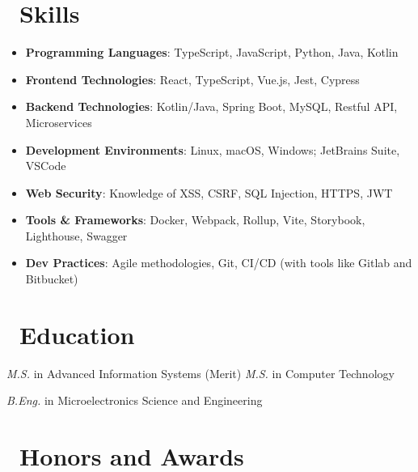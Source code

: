 \documentclass{resume}
\begin{document}

\section{\faCogs\ Skills}
\begin{itemize}[parsep=0.5ex]
  \item \textbf{Programming Languages}: TypeScript, JavaScript, Python, Java, Kotlin
  \item \textbf{Frontend Technologies}: React, TypeScript, Vue.js, Jest, Cypress
  \item \textbf{Backend Technologies}: Kotlin/Java, Spring Boot, MySQL, Restful API, Microservices
  \item \textbf{Development Environments}: Linux, macOS, Windows; JetBrains Suite, VSCode
  \item \textbf{Web Security}: Knowledge of XSS, CSRF, SQL Injection, HTTPS, JWT
  \item \textbf{Tools \& Frameworks}: Docker, Webpack, Rollup, Vite, Storybook, Lighthouse, Swagger 
  \item \textbf{Dev Practices}: Agile methodologies, Git, CI/CD (with tools like Gitlab and Bitbucket)
\end{itemize}

\section{\faGraduationCap\ Education}
\textit{M.S.} in Advanced Information Systems (Merit)
\textit{M.S.} in Computer Technology

\textit{B.Eng.} in Microelectronics Science and Engineering

\section{\faHeartO\ Honors and Awards}
\end{document}
